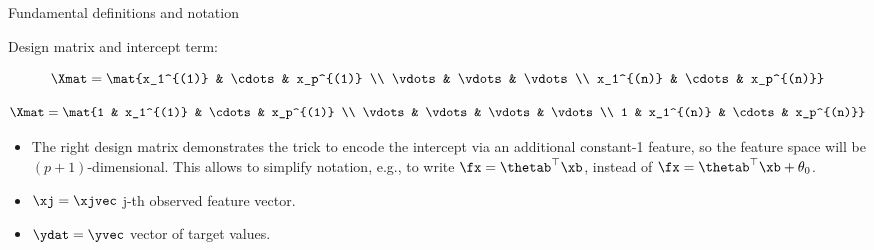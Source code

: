 \begin{vbframe}{Fundamental definitions and notation}
\begin{itemize}
\end{itemize}


\framebreak

% 
% 
% 
% 
%   

Design matrix and intercept term:
  
  \begin{minipage}{0.45\textwidth}
$$
  \Xmat  = \mat{x_1^{(1)} & \cdots & x_p^{(1)} \\
    \vdots    & \vdots & \vdots \\
    x_1^{(n)} & \cdots & x_p^{(n)}}
$$
  \end{minipage}
\begin{minipage}{0.45\textwidth}
$$
  \Xmat  = \mat{1      & x_1^{(1)} & \cdots & x_p^{(1)} \\
    \vdots & \vdots    & \vdots & \vdots \\
    1      & x_1^{(n)} & \cdots & x_p^{(n)}}
$$
  \end{minipage}

\begin{itemize}
\item The right design matrix demonstrates the trick to encode the intercept via an additional
constant-1 feature, so the feature space will be $(p+1)$-dimensional.
This allows to simplify notation, e.g., to write $\fx = \thetab^\top \xb$, instead of $\fx = \thetab^\top \xb + \theta_0$.
\item $\xj = \xjvec$ j-th observed feature vector.
\item $\ydat = \yvec$ vector of target values.
\end{itemize}

\end{vbframe}

